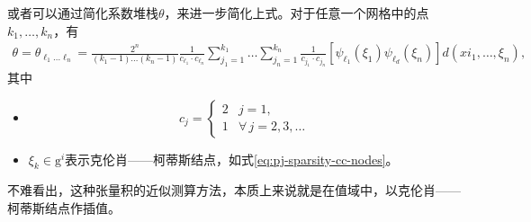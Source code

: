 或者可以通过简化系数堆栈$\theta$，来进一步简化上式。对于任意一个网格中的点$k_{1}, \ldots, k_{n}$，有
\begin{equation}
  \label{eq:pj-sparsity-theta-tensor-expansion}
  \begin{split}
    \theta = \theta_{\ell_{1} \ldots \ell_{n}}
    = \frac{
    2^{n}
    }{
    \left( k_{1} - 1 \right) \ldots \left( k_{n} - 1 \right)
    }
    \frac{
    1
    }{
    c_{\ell_{1}} \cdot c_{\ell_{n}}
    }
    \sum_{j_{1} =1}^{k_{1}} \ldots \sum_{j_{n} =1}^{k_{n}}
    \frac{
    1
    }{
    c_{j_{1}} \cdot c_{j_{n}}
    }
    \left[
    \psi_{\ell_{1}} \left( \xi_{1} \right)
    \psi_{\ell_{d}} \left( \xi_{n} \right)
    \right]
    d \left( xi_{1}, \ldots, \xi_{n} \right),
  \end{split}
\end{equation}
其中
\begin{itemize}
  \item
  \begin{equation*}
  c_{j} =
  \begin{cases}
  2 & j=1, \\
  1 & \forall \, j=2,3,\ldots
  \end{cases}
  \end{equation*}
  \item $\xi_{k} \in \mathrm{g}^{i}$表示克伦肖——柯蒂斯结点，如式\eqref{eq:pj-sparsity-cc-nodes}。
\end{itemize}

不难看出，这种张量积的近似测算方法，本质上来说就是在值域中，以克伦肖——柯蒂斯结点作插值。
